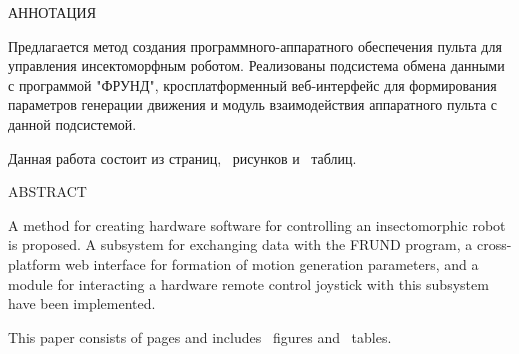 \begin{center}
	АННОТАЦИЯ
\end{center}

Предлагается метод создания программного-аппаратного обеспечения пульта для управления
инсектоморфным роботом. Реализованы подсистема обмена данными с программой "ФРУНД"{}, 
кросплатформенный веб-интерфейс для формирования параметров генерации
движения и модуль взаимодействия аппаратного пульта с данной подсистемой.

Данная работа состоит из \pageref{LastPage} страниц, \totalfigures ~рисунков и
\totaltables ~таблиц. 

\begin{center}
	ABSTRACT
\end{center}

A method for creating hardware software for controlling an insectomorphic robot is proposed. A subsystem for exchanging
data with the FRUND program, a cross-platform web interface for formation of motion generation parameters, and a module for
interacting a hardware remote control joystick with this subsystem have been implemented.

This paper consists of \pageref{LastPage} pages and includes \totalfigures ~figures and
\totaltables ~tables.